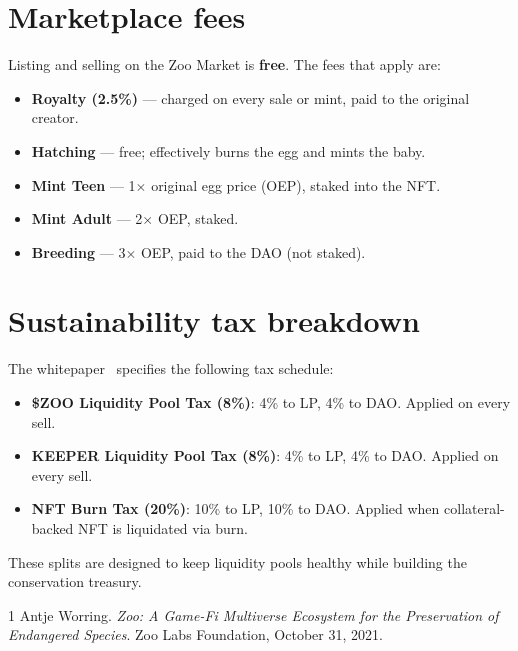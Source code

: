 \documentclass[11pt,letterpaper]{article}
\begin{document}
\section{Marketplace fees}

Listing and selling on the Zoo Market is \textbf{free}. The fees that apply are:

\begin{itemize}
  \item \textbf{Royalty (2.5\%)} --- charged on every sale or mint, paid to the original creator.
  \item \textbf{Hatching} --- free; effectively burns the egg and mints the baby.
  \item \textbf{Mint Teen} --- 1$\times$ original egg price (OEP), staked into the NFT.
  \item \textbf{Mint Adult} --- 2$\times$ OEP, staked.
  \item \textbf{Breeding} --- 3$\times$ OEP, paid to the DAO (not staked).
\end{itemize}

\section{Sustainability tax breakdown}

The whitepaper~\cite{zoo2021} specifies the following tax schedule:

\begin{itemize}
  \item \textbf{\$ZOO Liquidity Pool Tax (8\%)}: 4\% to LP, 4\% to DAO. Applied on every sell.
  \item \textbf{KEEPER Liquidity Pool Tax (8\%)}: 4\% to LP, 4\% to DAO. Applied on every sell.
  \item \textbf{NFT Burn Tax (20\%)}: 10\% to LP, 10\% to DAO. Applied when collateral-backed NFT is liquidated via burn.
\end{itemize}

These splits are designed to keep liquidity pools healthy while building the conservation treasury.

\begin{thebibliography}{1}
 Antje Worring. \emph{Zoo: A Game-Fi Multiverse Ecosystem for the Preservation of Endangered Species}. Zoo Labs Foundation, October 31, 2021.
\end{thebibliography}
\end{document}
